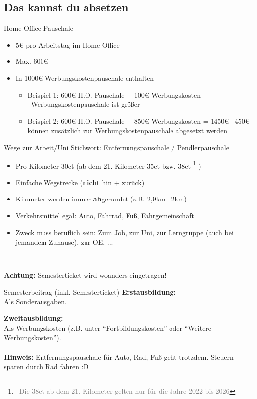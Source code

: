 \documentclass[draft]{beamer}
\newcommand{\n}{\hfill\\\vspace{0.25cm}}
\let\oldfootnote\footnote
\renewcommand{\footnote}[1]
{%
	\oldfootnote
	{
		\tiny
		\textcolor{gray}{\ #1}
	}%
}
\begin{document}
		\subsection{Das kannst du absetzen}
		
			\begin{frame}{Home-Office Pauschale}
				\begin{itemize}
					\item 5€ pro Arbeitstag im Home-Office
					\item Max. 600€
					\item In 1000€ Werbungskostenpauschale enthalten
					\begin{itemize}
						\item Beispiel 1: 600€ H.O. Pauschale + 100€ Werbungskosten \textrightarrow\ Werbungskostenpauschale ist größer
						\item Beispiel 2: 600€ H.O. Pauschale + 850€ Werbungskosten = 1450€ \textrightarrow\ 450€ können zusätzlich zur Werbungskostenpauschale abgesetzt werden
					\end{itemize}
				\end{itemize}
			\end{frame}
		
			\begin{frame}{Wege zur Arbeit/Uni}
				Stichwort: Entfernungspauschale / Pendlerpauschale\n
				
				\begin{itemize}
					\item Pro Kilometer 30ct (ab dem 21. Kilometer 35ct bzw. 38ct\footnote{Die 38ct ab dem 21. Kilometer gelten nur für die Jahre 2022 bis 2026})
					\item Einfache Wegstrecke (\textbf{nicht} hin + zurück)
					\item Kilometer werden immer \textbf{ab}gerundet (z.B. 2,9km \textrightarrow\ 2km)
					\item Verkehrsmittel egal: Auto, Fahrrad, Fuß, Fahrgemeinschaft
					\item Zweck muss beruflich sein: Zum Job, zur Uni, zur Lerngruppe (auch bei jemandem Zuhause), zur OE, ...
				\end{itemize}\n\pause
				
				\textbf{Achtung:} Semesterticket wird woanders eingetragen!
			\end{frame}
		
			\begin{frame}{Semesterbeitrag (inkl. Semesterticket)}
				\textbf{Erstausbildung:}\\
				Als Sonderausgaben.\n
				
				\textbf{Zweitausbildung:}\\
				Als Werbungskosten (z.B. unter "`Fortbildungskosten"' oder "`Weitere Werbungskosten"').\n
				\hfill\\\pause
				\textbf{Hinweis:} Entfernungspauschale für Auto, Rad, Fuß geht trotzdem. Steuern sparen durch Rad fahren :D
			\end{frame}
		
\end{document}

